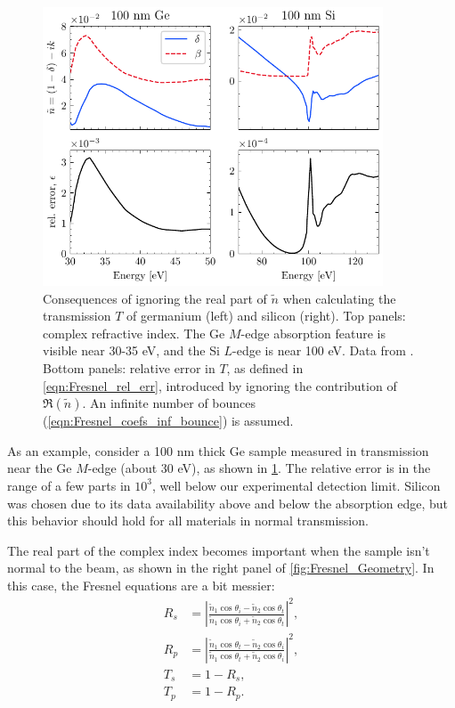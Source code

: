 \begin{figure}
	\centering
	\includegraphics[width=0.9\textwidth]{figures/chap1/Ge_Si_transmission_Fresnel.pdf}
	\caption{Consequences of ignoring the real part of $\tilde{n}$ when calculating the transmission $T$ of germanium (left) and silicon (right). Top panels: complex refractive index. The Ge $M$-edge absorption feature is visible near 30-35 eV, and the Si $L$-edge is near 100 eV. Data from \cite{gulliksonCXROXRayInteractions}. Bottom panels: relative error in $T$, as defined in \cref{eqn:Fresnel_rel_err}, introduced by ignoring the contribution of $\Re(\tilde{n})$. An infinite number of bounces (\cref{eqn:Fresnel_coefs_inf_bounce}) is assumed.}
	\label{fig:Ge_Si_transmission_Fresnel}
\end{figure}

As an example, consider a 100 nm thick Ge sample measured in transmission near the Ge $M$-edge (about 30 eV), as shown in \cref{fig:Ge_Si_transmission_Fresnel}. The relative error is in the range of a few parts in $10^3$, well below our experimental detection limit. Silicon was chosen due to its data availability above and below the absorption edge, but this behavior should hold for all materials in normal transmission.

The real part of the complex index becomes important when the sample isn't normal to the beam, as shown in the right panel of \cref{fig:Fresnel_Geometry}. In this case, the Fresnel equations are a bit messier:
\begin{equation}
	\begin{aligned}
		R_s &= \left| \frac{\tilde{n}_1 \cos \theta_i - \tilde{n}_2 \cos \theta_t}{\tilde{n}_1 \cos \theta_i + \tilde{n}_2 \cos \theta_t}  \right|^2, \\
		R_p &= \left| \frac{\tilde{n}_1 \cos \theta_t - \tilde{n}_2 \cos \theta_i}{\tilde{n}_1 \cos \theta_t + \tilde{n}_2 \cos \theta_i}  \right|^2, \\
		T_s &= 1 - R_s, \\
		T_p &= 1 - R_p. \\
	\end{aligned}
	\label{eqn:Fresnel_nonnormal}
\end{equation}

